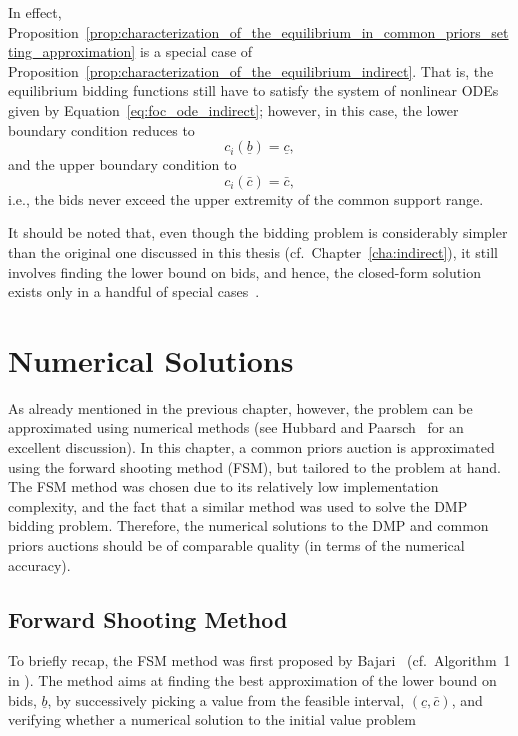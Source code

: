 In effect, Proposition~\ref{prop:characterization_of_the_equilibrium_in_common_priors_setting_approximation} is a special case of Proposition~\ref{prop:characterization_of_the_equilibrium_indirect}. That is, the equilibrium bidding functions still have to satisfy the system of nonlinear ODEs given by Equation~\eqref{eq:foc_ode_indirect}; however, in this case, the lower boundary condition reduces to
\begin{equation*}
  c_i(\underline{b}) = \underline{c},
\end{equation*}
and the upper boundary condition to
\begin{equation*}
  c_i(\bar{c}) = \bar{c},
\end{equation*}
i.e., the bids never exceed the upper extremity of the common support range.

It should be noted that, even though the bidding problem is considerably simpler than the original one discussed in this thesis (cf.~Chapter~\ref{cha:indirect}), it still involves finding the lower bound on bids, and hence, the closed-form solution exists only in a handful of special cases~\cite{Krishna10,HubbardPaarsch2011}.


\section{Numerical Solutions} %
\label{sec:numerical_solutions}

As already mentioned in the previous chapter, however, the problem can be approximated using numerical methods (see Hubbard and Paarsch~\cite{HubbardPaarsch2011} for an excellent discussion). In this chapter, a common priors auction is approximated using the forward shooting method (FSM), but tailored to the problem at hand. The FSM method was chosen due to its relatively low implementation complexity, and the fact that a similar method was used to solve the DMP bidding problem. Therefore, the numerical solutions to the DMP and common priors auctions should be of comparable quality (in terms of the numerical accuracy).

\subsection{Forward Shooting Method} %
\label{sub:forward_shooting_method}

To briefly recap, the FSM method was first proposed by Bajari~\cite{Bajari2001a} (cf.~Algorithm~1 in \cite{Bajari2001a}). The method aims at finding the best approximation of the lower bound on bids, $\underline{b}$, by successively picking a value from the feasible interval, $(\underline{c}, \bar{c})$, and verifying whether a numerical solution to the initial value problem

